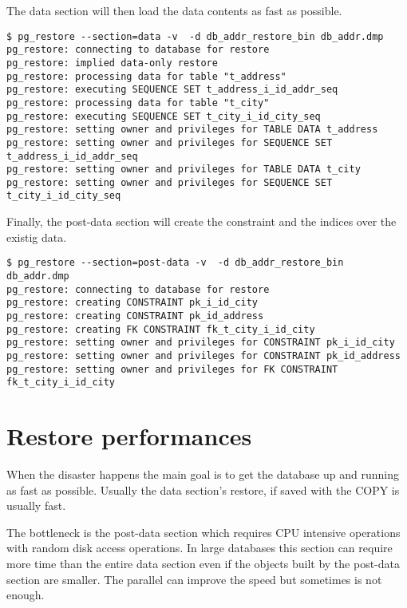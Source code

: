 The data section will then load the data contents as fast as possible.

\begin{verbatim}
$ pg_restore --section=data -v  -d db_addr_restore_bin db_addr.dmp 
pg_restore: connecting to database for restore
pg_restore: implied data-only restore
pg_restore: processing data for table "t_address"
pg_restore: executing SEQUENCE SET t_address_i_id_addr_seq
pg_restore: processing data for table "t_city"
pg_restore: executing SEQUENCE SET t_city_i_id_city_seq
pg_restore: setting owner and privileges for TABLE DATA t_address
pg_restore: setting owner and privileges for SEQUENCE SET t_address_i_id_addr_seq
pg_restore: setting owner and privileges for TABLE DATA t_city
pg_restore: setting owner and privileges for SEQUENCE SET t_city_i_id_city_seq

\end{verbatim}

Finally, the post-data section will create the constraint and the indices over the existig data.

\begin{verbatim}
$ pg_restore --section=post-data -v  -d db_addr_restore_bin db_addr.dmp 
pg_restore: connecting to database for restore
pg_restore: creating CONSTRAINT pk_i_id_city
pg_restore: creating CONSTRAINT pk_id_address
pg_restore: creating FK CONSTRAINT fk_t_city_i_id_city
pg_restore: setting owner and privileges for CONSTRAINT pk_i_id_city
pg_restore: setting owner and privileges for CONSTRAINT pk_id_address
pg_restore: setting owner and privileges for FK CONSTRAINT fk_t_city_i_id_city

\end{verbatim}


\section{Restore performances}

When the disaster happens the main goal is to get the database up and running as fast as possible. 
Usually the data section's restore, if saved with the COPY is usually fast.\newline 

The bottleneck is the post-data section which requires CPU intensive operations with random disk access 
operations. In large databases this section can require more time than the entire data section even 
if the objects built by the post-data section are smaller. The parallel can improve the speed but 
sometimes is not enough. \newline

